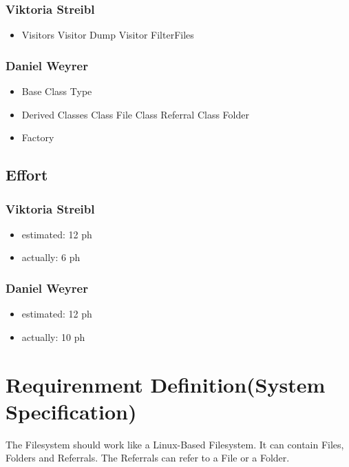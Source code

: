 \subsubsection{Viktoria Streibl}
\begin{itemize}
	\item Visitors
	\subitem Visitor Dump
	\subitem Visitor FilterFiles			
\end{itemize}

\subsubsection{Daniel Weyrer}
\begin{itemize}
	\item Base Class Type
	\item Derived Classes
		\subitem Class File
		\subitem Class Referral
		\subitem Class Folder
	\item Factory
\end{itemize}

\subsection{Effort}

\subsubsection {Viktoria Streibl}
\begin{itemize}
	\item estimated: 12 ph 
	\item actually: 6 ph
\end{itemize}

\subsubsection {Daniel Weyrer}
\begin{itemize}
	\item estimated: 12 ph 
	\item actually: 10 ph
\end{itemize}

\section{Requirenment Definition(System Specification)}
The Filesystem should work like a Linux-Based Filesystem. It can contain Files, Folders and Referrals. The Referrals can refer to a File or a Folder.

